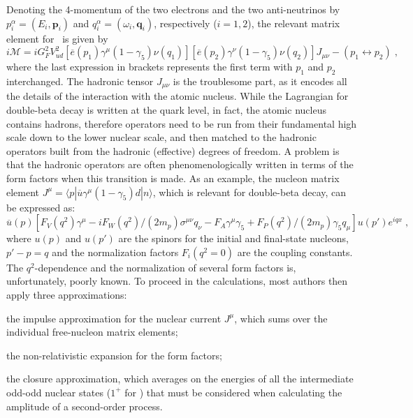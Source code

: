 Denoting the 4-momentum of the two electrons and the two anti-neutrinos by $p^\alpha_i =
(E_i,\mathbf{p}_i)$ and $q^\alpha_i = (\omega_i,\mathbf{q}_i)$, respectively ($i=1,2$),
the relevant matrix element for \nnbb\ is given by
\[
  i\mathcal{M} = iG^2_F V^2_{ud}
                 [\overline{e}(p_1) \gamma^\mu (1-\gamma_5) \nu(q_1)]
                 [\overline{e}(p_2) \gamma^\nu (1-\gamma_5) \nu(q_2)]
                 J_{\mu\nu} - (p_1\leftrightarrow p_2) \;,
\]
where the last expression in brackets represents the first term with $p_1$ and $p_2$
interchanged. The hadronic tensor $J_{\mu\nu}$ is the troublesome part, as it encodes all
the details of the interaction with the atomic nucleus. While the Lagrangian for
double-beta decay is written at the quark level, in fact, the atomic nucleus contains
hadrons, therefore operators need to be run from their fundamental high scale down to the
lower nuclear scale, and then matched to the hadronic operators built from the hadronic
(effective) degrees of freedom. A problem is that the hadronic operators are often
phenomenologically written in terms of the form factors when this transition is made. As
an example, the nucleon matrix element $J^\mu = \langle{p}| \overline{u} \gamma^\mu
(1-\gamma_5) d |{n}\rangle$, which is relevant for double-beta decay, can be expressed as:
\[
  \overline{u}(p) \left[
    F_V(q^2)\gamma^\mu
    - iF_W(q^2)/(2m_p) \sigma^{\mu\nu} q_\nu
    - F_A\gamma^\mu\gamma_5
    + F_P(q^2)/(2m_p)\gamma_5q_\mu
  \right] u(p')e^{iqx} \;,
\]
where $u(p)$ and $u(p')$ are the spinors for the initial and final-state nucleons, $p'-p=q$
and the normalization factors $F_i(q^2=0)$ are the coupling constants. The
$q^2$-dependence and the normalization of several form factors is, unfortunately, poorly
known.  To proceed in the calculations, most authors then apply three approximations:
\begin{inparaenum}[\itshape a)]
  \item the impulse approximation for the nuclear current $J^\mu$, which sums over the
    individual free-nucleon matrix elements;
  \item the non-relativistic expansion for the form factors;
  \item the closure approximation, which averages on the energies of all the intermediate
    odd-odd nuclear states ($1^+$ for \nnbb) that must be considered when calculating the
    amplitude of a second-order process. 
\end{inparaenum}
